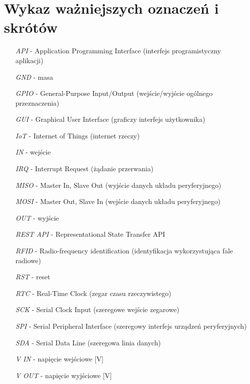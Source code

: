 \section*{Wykaz ważniejszych oznaczeń i skrótów}


	\begin{itemize}
		\item[\textit{API}] - Application Programming Interface (interfejs programistyczny aplikacji)
		\item[\textit{GND}] - masa
		\item[\textit{GPIO}] - General-Purpose Input/Output (wejście/wyjście ogólnego przeznaczenia)
		\item[\textit{GUI}] - Graphical User Interface (graficzy interfejs użytkownika)
		\item[\textit{IoT}] - Internet of Things (internet rzeczy)
		\item[\textit{IN}] - wejście
		\item[\textit{IRQ}] - Interrupt Request (żądanie przerwania)
		\item[\textit{MISO}] - Master In, Slave Out (wyjście danych układu peryferyjnego)
		\item[\textit{MOSI}] - Master Out, Slave In (wejście danych układu peryferyjnego)
		\item[\textit{OUT}] - wyjście
		\item[\textit{REST API}] - Representational State Transfer API
		\item[\textit{RFID}] - Radio-frequency identification (identyfikacja wykorzystująca fale radiowe)
		\item[\textit{RST}] - reset
		\item[\textit{RTC}] - Real-Time Clock (zegar czasu rzeczywistego)
		\item[\textit{SCK}] - Serial Clock Input (szeregowe wejście zegarowe)
		\item[\textit{SPI}] - Serial Peripheral Interface (szeregowy interfejs urządzeń peryferyjnych)
		\item[\textit{SDA}] - Serial Data Line (szeregowa linia danych)
		\item[\textit{V IN}] - napięcie wejściowe [V]
		\item[\textit{V OUT}] - napięcie wyjściowe [V]

	\end{itemize}



